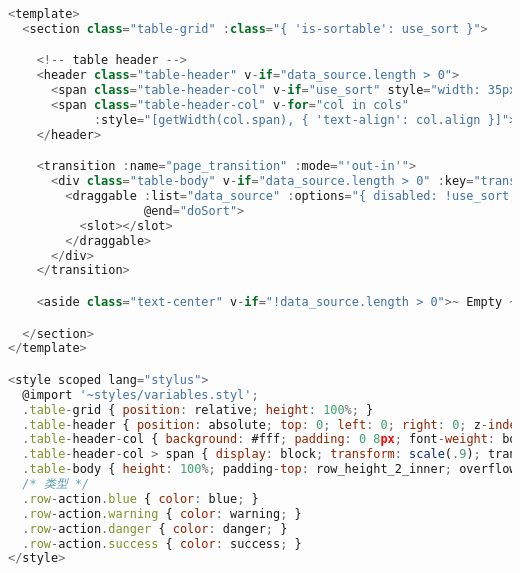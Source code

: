 \begin{lstlisting}[language=JavaScript]
<template>
  <section class="table-grid" :class="{ 'is-sortable': use_sort }">

    <!-- table header -->
    <header class="table-header" v-if="data_source.length > 0">
      <span class="table-header-col" v-if="use_sort" style="width: 35px;"><span>排序</span></span>
      <span class="table-header-col" v-for="col in cols"
            :style="[getWidth(col.span), { 'text-align': col.align }]"><span v-html="col.col_title"></span></span>
    </header>

    <transition :name="page_transition" :mode="'out-in'">
      <div class="table-body" v-if="data_source.length > 0" :key="transition_key">
        <draggable :list="data_source" :options="{ disabled: !use_sort, animation: 150, handle: '.drag-handle' }"
                   @end="doSort">
          <slot></slot>
        </draggable>
      </div>
    </transition>

    <aside class="text-center" v-if="!data_source.length > 0">~ Empty ~</aside>

  </section>
</template>

<style scoped lang="stylus">
  @import '~styles/variables.styl';
  .table-grid { position: relative; height: 100%; }
  .table-header { position: absolute; top: 0; left: 0; right: 0; z-index: 100; display: flex; line-height: row_height_2_inner; white-space: nowrap; box-shadow: 0 1px 2px -1px rgba(0, 0, 0, .3); }
  .table-header-col { background: #fff; padding: 0 8px; font-weight: bold; }
  .table-header-col > span { display: block; transform: scale(.9); transform-origin: 0 100%; }
  .table-body { height: 100%; padding-top: row_height_2_inner; overflow-y: auto; }
  /* 类型 */
  .row-action.blue { color: blue; }
  .row-action.warning { color: warning; }
  .row-action.danger { color: danger; }
  .row-action.success { color: success; }
</style>


\end{lstlisting}
